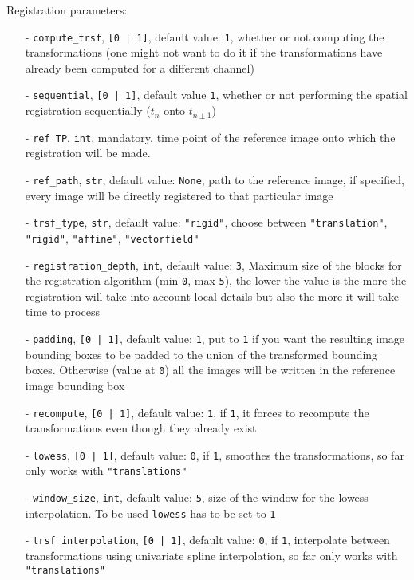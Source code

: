 \documentclass[10pt,a4paper]{book}
\begin{document}
Registration parameters:
\begin{itemize}
\item[-] \texttt{compute\_trsf}, \texttt{[0 | 1]}, default value: \texttt{1}, whether or not computing the transformations (one might not want to do it if the transformations have already been computed for a different channel)
\item[-] \texttt{sequential}, \texttt{[0 | 1]}, default value \texttt{1}, whether or not performing the spatial registration sequentially ($t_n$ onto $t_{n\pm1}$)
\item[-] \texttt{ref\_TP}, \texttt{int}, mandatory, time point of the reference image onto which the registration will be made.
\item[-] \texttt{ref\_path}, \texttt{str}, default value: \texttt{None}, path to the reference image, if specified, every image will be directly registered to that particular image
\item[-] \texttt{trsf\_type}, \texttt{str}, default value: \texttt{"rigid"}, choose between \texttt{"translation"}, \texttt{"rigid"}, \texttt{"affine"}, \texttt{"vectorfield"}
\item[-] \texttt{registration\_depth}, \texttt{int}, default value: \texttt{3}, Maximum size of the blocks for the registration algorithm (min \texttt{0}, max \texttt{5}), the lower the value is the more the registration will take into account local details but also the more it will take time to process
\item[-] \texttt{padding}, \texttt{[0 | 1]}, default value: \texttt{1}, put to \texttt{1} if you want the resulting image bounding boxes to be padded to the union of the transformed bounding boxes. Otherwise (value at \texttt{0}) all the images will be written in the reference image bounding box
\item[-] \texttt{recompute}, \texttt{[0 | 1]}, default value: \texttt{1}, if \texttt{1}, it forces to recompute the transformations even though they already exist
\item[-] \texttt{lowess}, \texttt{[0 | 1]}, default value: \texttt{0}, if \texttt{1}, smoothes the transformations, so far only works with \texttt{"translations"}
\item[-] \texttt{window\_size}, \texttt{int}, default value: \texttt{5}, size of the window for the lowess interpolation. To be used \texttt{lowess} has to be set to \texttt{1}
\item[-]\texttt{trsf\_interpolation}, \texttt{[0 | 1]}, default value: \texttt{0}, if \texttt{1}, interpolate between transformations using univariate spline interpolation, so far only works with \texttt{"translations"}

\end{itemize}
\end{document}
